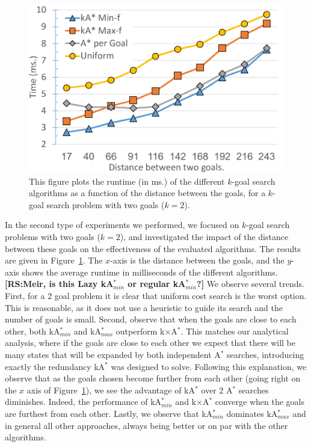 \documentclass{aicom2e}
\newcommand{\kgs}{$k$-goal search}
\newcommand{\astar}{A$^*$}
\newcommand{\kastar}{kA$^*$}
\newcommand{\kastarmin}{kA$^*_{min}$}
\newcommand{\kastarmax}{kA$^*_{max}$}
\newcommand{\kxastar}{k$\times$A$^*$}
\newcommand{\roni}[1]{\textbf{[RS:#1]}}
\begin{document}
\begin{figure}
	\includegraphics[width=\columnwidth]{G0-G1_cropped.pdf}      
	\caption{This figure plots the runtime (in ms.) of the different \kgs{} algorithms as a function of the distance between the goals, for a \kgs{} problem with two goals ($k=2$).}
	\label{fig:2-goal}
\end{figure}
In the second type of experiments we performed, we focused on \kgs{} problems with two goals ($k=2$), and investigated the impact of the distance between these goals on the effectiveness of the evaluated algorithms. 
The results are given in Figure~\ref{fig:2-goal}. The $x$-axis is the distance between the goals, and the $y$-axis shows the average runtime in milliseconds of the different algorithms. 
\roni{Meir, is this Lazy \kastarmin{} or regular \kastarmin{}?} 
We observe several trends. 
First, for a 2 goal problem it is clear that uniform cost search is the worst option. 
This is reasonable, as it does not use a heuristic to guide its search and the number of goals is small. 
Second, observe that when the goals are close to each other, both \kastarmin{} 
and \kastarmax{} outperform \kxastar{}. This matches our analytical analysis, where if the goals are close to each other we expect that there will be many states that will be expanded by both independent \astar{} searches, introducing exactly the redundancy \kastar{} was designed to solve. 
Following this explanation, we observe that as the goals chosen become further from each other (going right on the $x$ axis of Figure~\ref{fig:2-goal}), we see the advantage of \kastar{} over 2 \astar{} searches diminishes. Indeed, the performance of \kastarmin{}  and \kxastar{} converge when the goals are furthest from each other. 
Lastly, we observe that \kastarmin{} dominates \kastarmax{} and in general all other approaches, always being better or on par with the other algorithms. 
\end{document}
